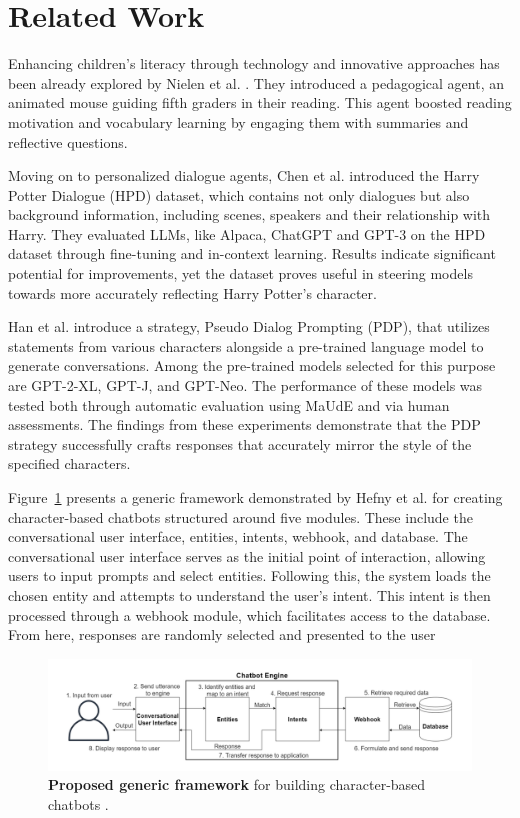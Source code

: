 \documentclass[fleqn,moreauthors,10pt]{ds_report}
\begin{document}
\section*{Related Work}
Enhancing children's literacy through technology and innovative approaches has been already explored by Nielen et al. \cite{nielen2018digital}. They introduced a pedagogical agent, an animated mouse guiding fifth graders in their reading. This agent boosted reading motivation and vocabulary learning by engaging them with summaries and reflective questions. 

Moving on to personalized dialogue agents, Chen et al. \cite{chen2023large} introduced the Harry Potter Dialogue (HPD) dataset, which contains not only dialogues but also background information, including scenes, speakers and their relationship with Harry. They evaluated LLMs, like Alpaca, ChatGPT and GPT-3 on the HPD dataset through fine-tuning and in-context learning. Results indicate significant potential for improvements, yet the dataset proves useful in steering models towards more accurately reflecting Harry Potter's character.

Han et al. \cite{han2022meet} introduce a strategy, Pseudo Dialog Prompting (PDP), that utilizes statements from various characters alongside a pre-trained language model to generate conversations. Among the pre-trained models selected for this purpose are GPT-2-XL, GPT-J, and GPT-Neo. The performance of these models was tested both through automatic evaluation using MaUdE and via human assessments. The findings from these experiments demonstrate that the PDP strategy successfully crafts responses that accurately mirror the style of the specified characters.

Figure~\ref{fig:generic_framework} presents a generic framework demonstrated by Hefny et al. \cite{generic_framework} for creating character-based chatbots structured around five modules. These include the conversational user interface, entities, intents, webhook, and database. The conversational user interface serves as the initial point of interaction, allowing users to input prompts and select entities. Following this, the system loads the chosen entity and attempts to understand the user's intent. This intent is then processed through a webhook module, which facilitates access to the database. From here, responses are randomly selected and presented to the user

\begin{figure}[ht]
        \centering 
	\includegraphics[width=\linewidth]{fig/general_framework_from_article.png}
	\caption{\textbf{Proposed generic framework} for building character-based chatbots \cite{generic_framework}.}
	\label{fig:generic_framework}
\end{figure}
\end{document}
